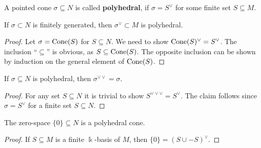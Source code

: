 \begin{definition}
  \label{polyhedral-cone}
  \leanok
  A pointed cone \( \sigma \subseteq N \) is called {\bf polyhedral},
  if \( \sigma = S^\vee \) for some finite set \( S \subseteq M \).
\end{definition}

\begin{proposition}
  \label{dual-polyhedral}
  \leanok
  If \( \sigma \subset N \) is finitely generated, then \( \sigma^\vee
  \subset M \) is polyhedral.
\end{proposition}
\begin{proof}
  \uses{}
  \leanok
  Let \( \sigma = \operatorname{Cone}(S) \) for \( S \subseteq N \). We need to show
  \( \operatorname{Cone}(S)^\vee = S^\vee \). The inclusion ``\( \subseteq \)'' is
  obvious, as \( S \subseteq \operatorname{Cone}(S) \). The opposite inclusion can
  be shown by induction on the general element of \( \operatorname{Cone}(S) \).
\end{proof}

\begin{proposition}
  \label{double-dual-polyhedral-cone}
  \leanok
  If \( \sigma \subseteq N \) is polyhedral, then \( \sigma^{\vee\vee}
  = \sigma \).
\end{proposition}
\begin{proof}
  \uses{}
  \leanok
  For any set \( S \subseteq N \) it is trivial to show \(
  S^{\vee\vee\vee} = S^{\vee} \). The claim follows since \( \sigma =
  S^{\vee} \) for a finite set \( S \subseteq N \).
\end{proof}

\begin{proposition}
  \label{bot-polyhedral}
  \leanok
  The zero-space \( \{0\} \subseteq N \) is a polyhedral cone.
\end{proposition}
\begin{proof}
  \uses{}
  \leanok
  If \( S \subseteq M \) is a finite \( \Bbbk \)-basis of \( M \),
  then \( \{0\} = (S \cup -S)^\vee \).
\end{proof}

